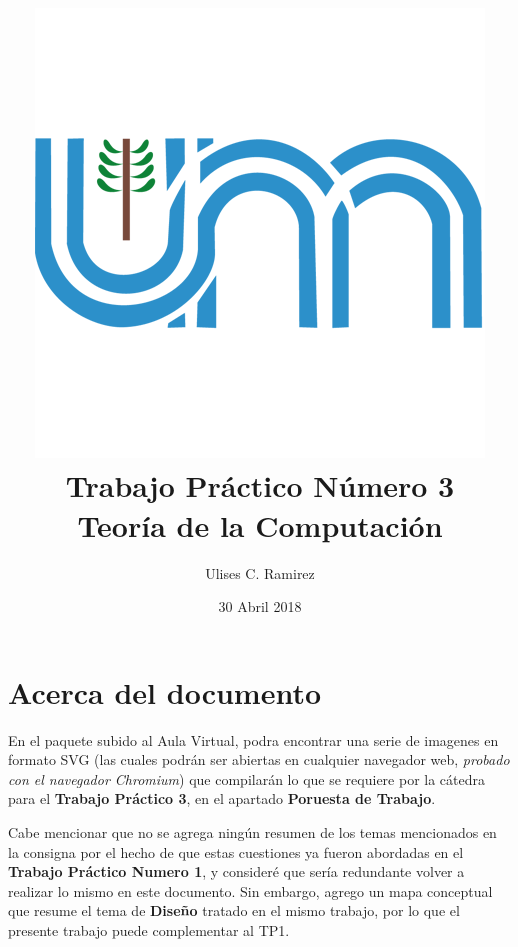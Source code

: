 \documentclass{article}
\begin{document}
\title{\includegraphics{unam-logo.png}\\Trabajo Pr\'actico N\'umero 3\\Teor\'ia de la Computaci\'on}
\author{Ulises C. Ramirez}
\date{30 Abril 2018}
\maketitle
{}
\newpage

\section*{Acerca del documento}
\label{sec:s1}
En el paquete subido al Aula Virtual, podra encontrar una serie de imagenes en formato SVG (las cuales podr\'an ser abiertas en cualquier navegador web, \textit{probado con el navegador Chromium}) que compilar\'an lo que se requiere por la c\'atedra para el {\bf Trabajo Pr\'actico 3}, en el apartado {\bf Poruesta de Trabajo}.

Cabe mencionar que no se agrega ning\'un resumen de los temas mencionados en la consigna por el hecho de que estas cuestiones ya fueron abordadas en el \textbf{Trabajo Pr\'actico Numero 1}, y consider\'e que ser\'ia redundante volver a realizar lo mismo en este documento. Sin embargo, agrego un mapa conceptual que resume el tema de \textbf{Dise\~{n}o} tratado en el mismo trabajo, por lo que el presente trabajo puede complementar al TP1.
\end{document}

